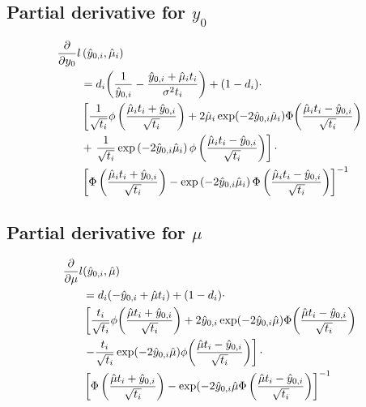 \subsection{Partial derivative for $y_0$}
\begin{align}
\label{eq:full-partial-deriv-y0}
\begin{split}
\frac{\partial}{\partial y_0}
l&\left(\hat{y}_{0,i}, \hat{\mu}_i\right) \\
&=
d_i
\p*{
    \frac{1}{\hat{y}_{0,i}}-\frac{\hat{y}_{0,i}+\hat{\mu}_i\ti}{\sigma^2\ti}
}+
(1-d_i)\cdot\\
&
\left[
    \frac{1}{\sqrt{\ti}}
    \phi\left(\frac{\hat{\mu}_i\ti+\hat{y}_{0,i}}{\sqrt{\ti}}\right)
    +2\hat{\mu}_i\exp\p*{-2\hat{y}_{0,i}\hat{\mu}_i}
    \Phi\p*{\frac{\hat{\mu}_i\ti-\hat{y}_{0,i}}{\sqrt{\ti}}}\right.\\
    &+\left.
    \frac{1}{\sqrt{\ti}}
    \exp\left(
        -2\hat{y}_{0,i}\hat{\mu}_i
    \right)
    \phi\left(\frac{\hat{\mu}_i\ti-\hat{y}_{0,i}}{\sqrt{\ti}}
    \right)
\right]\cdot\\
&\left[
    \Phi\left(
        \frac{\hat{\mu}_i t_i + \hat{y}_{0,i}}{\sqrt{t_i}}
    \right)
    -\exp\left(-2\hat{y}_{0,i}\hat{\mu}_i\right)
    \Phi
    \left(
        \frac{\hat{\mu}_i t_i - \hat{y}_{0,i}}{\sqrt{t_i}}
    \right)
\right]^{-1}
\end{split}
\end{align}

\subsection{Partial derivative for $\mu$}
\begin{align}
\label{eq:full-partial-deriv-mu}
\begin{split}
\frac{\partial}{\partial \mu}
l&(\hat{y}_{0,i}, \hat{\mu}) \\
&=
d_i\p*{-\hat{y}_{0,i}+\hat{\mu}\ti}+(1-d_i)\cdot \\
&\left[
\frac{\ti}{\sqrt{\ti}}\phi\p*{\frac{\hat{\mu}\ti+\hat{y}_{0,i}}{\sqrt{\ti}}}+2\hat{y}_{0,i}\exp\p*{-2\hat{y}_{0,i}\hat{\mu}}\Phi\p*{\frac{\hat{\mu}\ti-\hat{y}_{0,i}}{\sqrt{\ti}}} \right.\\
&\left.-\frac{\ti}{\sqrt{\ti}}\exp\p*{-2\hat{y}_{0,i}\hat{\mu}}\phi\p*{\frac{\hat{\mu}\ti-\hat{y}_{0,i}}{\sqrt{\ti}}}
\right] \cdot \\
&
\left[ \Phi\left(\frac{\hat{\mu} t_i + \hat{y}_{0,i}}{\sqrt{t_i}}\right)-\exp(-2\hat{y}_{0,i}\hat{\mu}\Phi\left(\frac{\hat{\mu} t_i - \hat{y}_{0,i}}{\sqrt{t_i}}\right)\right]^{-1}
\end{split}
\end{align}

